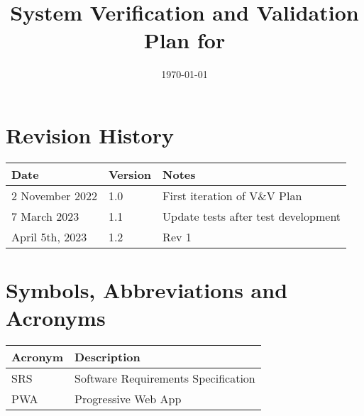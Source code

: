 \documentclass[12pt, titlepage]{article}
\begin{document}
\title{System Verification and Validation Plan for \progname{}} 
\author{\authname}
\date{\today}
	
\maketitle


\section{Revision History}

\begin{tabularx}{\textwidth}{p{3.2cm}p{1.8cm}X}
\toprule {\bf Date} & {\bf Version} & {\bf Notes}\\
\midrule
2 November 2022 & 1.0 & First iteration of V\&V Plan\\
7 March 2023 & 1.1 & Update tests after test development\\
April 5th, 2023 & 1.2 & Rev 1\\
\bottomrule
\end{tabularx}

\newpage

\tableofcontents

\listoftables
{}


\newpage

\section{Symbols, Abbreviations and Acronyms}

\renewcommand{\arraystretch}{1.2}
\begin{tabular}{l l} 
  \toprule		
  \textbf{Acronym} & \textbf{Description}\\
  \midrule 
  SRS & Software Requirements Specification\\
  PWA & Progressive Web App\\
  \bottomrule
\end{tabular}\\



\newpage
\end{document}

